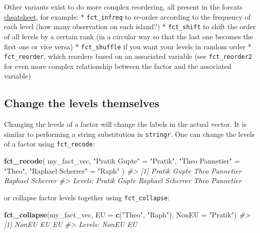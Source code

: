 \documentclass[]{book}
\newenvironment{Shaded}{}{}
\newcommand{\CommentTok}[1]{\textcolor[rgb]{0.38,0.63,0.69}{\textit{#1}}}
\newcommand{\DataTypeTok}[1]{\textcolor[rgb]{0.56,0.13,0.00}{#1}}
\newcommand{\KeywordTok}[1]{\textcolor[rgb]{0.00,0.44,0.13}{\textbf{#1}}}
\newcommand{\NormalTok}[1]{#1}
\newcommand{\StringTok}[1]{\textcolor[rgb]{0.25,0.44,0.63}{#1}}
\begin{document}
Other variants exist to do more complex reordering, all present in the forcats \href{https://rstudio.com/resources/cheatsheets/}{cheatsheet}, for example:
* \texttt{fct\_infreq} to re-order according to the frequency of each level (how many observation on each island?)
* \texttt{fct\_shift} to shift the order of all levels by a certain rank (in a circular way so that the last one becomes the first one or vice versa)
* \texttt{fct\_shuffle} if you want your levels in random order
* \texttt{fct\_reorder}, which reorders based on an associated variable (see \texttt{fct\_reorder2} for even more complex relationship between the factor and the associated variable)

\hypertarget{change-the-levels-themselves}{%
\subsection{Change the levels themselves}\label{change-the-levels-themselves}}

Changing the levels of a factor will change the labels in the actual vector. It is similar to performing a string substitution in \texttt{stringr}. One can change the levels of a factor using \texttt{fct\_recode}:

\begin{Shaded}
\begin{Highlighting}[]
\KeywordTok{fct_recode}\NormalTok{(}
\NormalTok{  my_fact_vec, }
  \StringTok{"Pratik Gupte"}\NormalTok{ =}\StringTok{ "Pratik"}\NormalTok{, }
  \StringTok{"Theo Pannetier"}\NormalTok{ =}\StringTok{ "Theo"}\NormalTok{, }
  \StringTok{"Raphael Scherrer"}\NormalTok{ =}\StringTok{ "Raph"}
\NormalTok{)}
\CommentTok{#> [1] Pratik Gupte     Theo Pannetier   Raphael Scherrer}
\CommentTok{#> Levels: Pratik Gupte Raphael Scherrer Theo Pannetier}
\end{Highlighting}
\end{Shaded}

or collapse factor levels together using \texttt{fct\_collapse}:

\begin{Shaded}
\begin{Highlighting}[]
\KeywordTok{fct_collapse}\NormalTok{(my_fact_vec, }\DataTypeTok{EU =} \KeywordTok{c}\NormalTok{(}\StringTok{"Theo"}\NormalTok{, }\StringTok{"Raph"}\NormalTok{), }\DataTypeTok{NonEU =} \StringTok{"Pratik"}\NormalTok{)}
\CommentTok{#> [1] NonEU EU    EU   }
\CommentTok{#> Levels: NonEU EU}
\end{Highlighting}
\end{Shaded}
\end{document}
